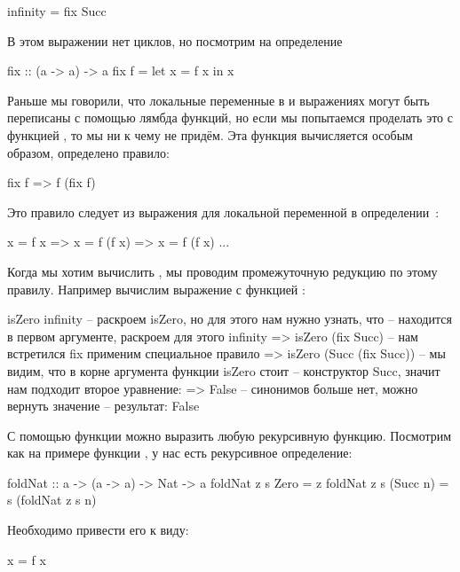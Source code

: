 \begin{code}
infinity = fix Succ 
\end{code}

В этом выражении нет циклов, но посмотрим на определение 

\begin{code}
fix :: (a -> a) -> a
fix f = let x = f x in x
\end{code}

Раньше мы говорили, что локальные переменные в  и 
выражениях могут быть переписаны с помощью лямбда функций, но если
мы попытаемся проделать это с функцией , то мы ни к чему 
не придём. Эта функция вычисляется особым образом, определено 
правило: 

\begin{code}
fix f   =>  f (fix f)
\end{code}

Это правило следует из выражения для локальной переменной
в \mbox{определении }:

\begin{code}
        x = f x
=>      x = f (f x)
=>      x = f (f x)
        ...
\end{code}

Когда мы хотим вычислить , мы проводим промежуточную
редукцию по этому правилу. Например вычислим выражение с функцией
:

\begin{code}
        isZero infinity
-- раскроем isZero, но для этого нам нужно узнать, что
-- находится в первом аргументе, раскроем для этого infinity
=>      isZero (fix Succ)
-- нам встретился fix применим специальное правило
=>      isZero (Succ (fix Succ))
-- мы видим, что в корне аргумента функции isZero стоит
-- конструктор Succ, значит нам подходит второе уравнение:
=>      False
-- синонимов больше нет, можно вернуть значение
-- результат:
        False
\end{code}

С помощью функции  можно выразить любую рекурсивную
функцию. Посмотрим как на примере функции ,
у нас есть рекурсивное определение:

\begin{code}
foldNat :: a -> (a -> a) -> Nat -> a
foldNat z  s  Zero      = z
foldNat z  s  (Succ n)  = s (foldNat z s n)
\end{code}

Необходимо привести его к виду:

\begin{code}
x = f x
\end{code}


